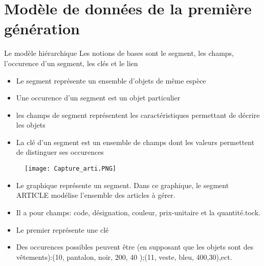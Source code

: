 \documentclass{beamer}
\begin{document}
\section{Mod\`ele de donn\'ees de la premi\`ere g\'en\'eration}
\begin{frame}{Le mod\`ele hi\'erarchique}
Les notions de bases sont le segment, les champs, l'occurence d'un segment, les cl\'es et le lien
    \begin{itemize}
        \item Le segment repr\'esente un ensemble d'objets de m\^eme esp\`ece
        \item Une occurence d'un segment est un objet particulier
        \item les champs de segment repr\'esentent les caract\'eristiques permettant de d\'ecrire les objets
        \item La cl\'e d'un segment est un ensemble de champs dont les valeurs permettent de distinguer ses occurences
    \end{itemize}
    \end{frame}
    \newpage
\begin{frame}
\begin{figure}[h]
\centering	
 \texttt{[image: Capture\_arti.PNG]}
\end{figure}

\end{frame}
    \begin{frame}
        
 \begin{itemize}
   \item Le graphique repr\'esente un segment. Dans ce graphique, le segment ARTICLE mod\'elise l'ensemble des articles \`a g\'erer.
    \item Il a pour champs: code, d\'esignation, couleur, prix-unitaire et la quantit\'e.tock.  
 \item Le premier repr\'esente une cl\'e
    \item Des occurences possibles peuvent \^etre (en supposant que les objets sont des v\^etements):(10, pantalon, noir, 200, 40 );(11, veste, bleu, 400,30),ect.
\end{itemize}
   \end{frame}
   
\end{document}
